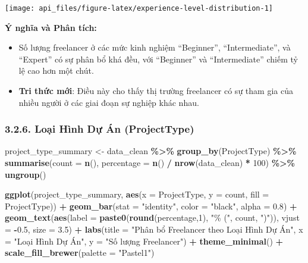 \documentclass[
]{article}
\newenvironment{Shaded}{\begin{snugshade}}{\end{snugshade}}
\newcommand{\AttributeTok}[1]{\textcolor[rgb]{0.13,0.29,0.53}{#1}}
\newcommand{\DecValTok}[1]{\textcolor[rgb]{0.00,0.00,0.81}{#1}}
\newcommand{\FloatTok}[1]{\textcolor[rgb]{0.00,0.00,0.81}{#1}}
\newcommand{\FunctionTok}[1]{\textcolor[rgb]{0.13,0.29,0.53}{\textbf{#1}}}
\newcommand{\NormalTok}[1]{#1}
\newcommand{\OtherTok}[1]{\textcolor[rgb]{0.56,0.35,0.01}{#1}}
\newcommand{\SpecialCharTok}[1]{\textcolor[rgb]{0.81,0.36,0.00}{\textbf{#1}}}
\newcommand{\StringTok}[1]{\textcolor[rgb]{0.31,0.60,0.02}{#1}}
\begin{document}
\begin{center}\texttt{[image: api\_files/figure-latex/experience-level-distribution-1]} \end{center}

\textbf{Ý nghĩa và Phân tích:}

\begin{itemize}
\item
  Số lượng freelancer ở các mức kinh nghiệm ``Beginner'',
  ``Intermediate'', và ``Expert'' có sự phân bổ khá đều, với
  ``Beginner'' và ``Intermediate'' chiếm tỷ lệ cao hơn một chút.
\item
  \textbf{Tri thức mới}: Điều này cho thấy thị trường freelancer có sự
  tham gia của nhiều người ở các giai đoạn sự nghiệp khác nhau.
\end{itemize}

\subsubsection{3.2.6. Loại Hình Dự Án
(ProjectType)}\label{loux1ea1i-huxecnh-dux1ef1-uxe1n-projecttype}

\begin{Shaded}
\begin{Highlighting}[]
\NormalTok{project\_type\_summary }\OtherTok{\textless{}{-}}\NormalTok{ data\_clean }\SpecialCharTok{\%\textgreater{}\%}
  \FunctionTok{group\_by}\NormalTok{(ProjectType) }\SpecialCharTok{\%\textgreater{}\%}
  \FunctionTok{summarise}\NormalTok{(}\AttributeTok{count =} \FunctionTok{n}\NormalTok{(),}
            \AttributeTok{percentage =} \FunctionTok{n}\NormalTok{() }\SpecialCharTok{/} \FunctionTok{nrow}\NormalTok{(data\_clean) }\SpecialCharTok{*} \DecValTok{100}\NormalTok{) }\SpecialCharTok{\%\textgreater{}\%}
  \FunctionTok{ungroup}\NormalTok{()}

\FunctionTok{ggplot}\NormalTok{(project\_type\_summary, }\FunctionTok{aes}\NormalTok{(}\AttributeTok{x =}\NormalTok{ ProjectType, }\AttributeTok{y =}\NormalTok{ count, }\AttributeTok{fill =}\NormalTok{ ProjectType)) }\SpecialCharTok{+}
  \FunctionTok{geom\_bar}\NormalTok{(}\AttributeTok{stat =} \StringTok{"identity"}\NormalTok{, }\AttributeTok{color =} \StringTok{"black"}\NormalTok{, }\AttributeTok{alpha =} \FloatTok{0.8}\NormalTok{) }\SpecialCharTok{+}
  \FunctionTok{geom\_text}\NormalTok{(}\FunctionTok{aes}\NormalTok{(}\AttributeTok{label =} \FunctionTok{paste0}\NormalTok{(}\FunctionTok{round}\NormalTok{(percentage,}\DecValTok{1}\NormalTok{), }\StringTok{"\% ("}\NormalTok{, count, }\StringTok{")"}\NormalTok{)), }\AttributeTok{vjust =} \SpecialCharTok{{-}}\FloatTok{0.5}\NormalTok{, }\AttributeTok{size =} \FloatTok{3.5}\NormalTok{) }\SpecialCharTok{+}
  \FunctionTok{labs}\NormalTok{(}\AttributeTok{title =} \StringTok{"Phân bổ Freelancer theo Loại Hình Dự Án"}\NormalTok{,}
       \AttributeTok{x =} \StringTok{"Loại Hình Dự Án"}\NormalTok{,}
       \AttributeTok{y =} \StringTok{"Số lượng Freelancer"}\NormalTok{) }\SpecialCharTok{+}
  \FunctionTok{theme\_minimal}\NormalTok{() }\SpecialCharTok{+}
  \FunctionTok{scale\_fill\_brewer}\NormalTok{(}\AttributeTok{palette =} \StringTok{"Pastel1"}\NormalTok{)}
\end{Highlighting}
\end{Shaded}
\end{document}
